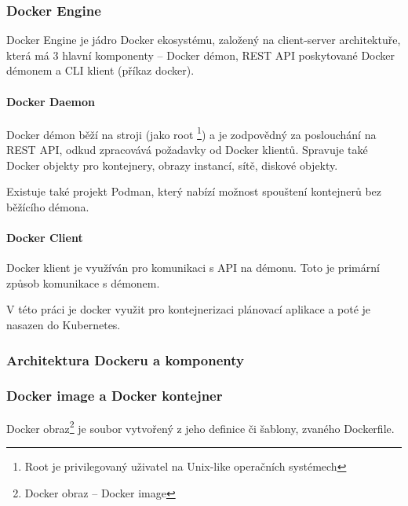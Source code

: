 \documentclass[thesis=M,czech]{FITthesis}[2019/12/23]
\theoremstyle{plain}
\theoremstyle{definition}
\begin{document}
\subsubsection{Docker Engine}

Docker Engine je jádro Docker ekosystému, založený na client-server architektuře, která má 3 hlavní komponenty -- Docker démon, REST API poskytované Docker démonem a CLI klient (příkaz docker).




\paragraph{Docker Daemon}

Docker démon běží na stroji (jako root \footnote{Root je privilegovaný uživatel na Unix-like operačních systémech}) a je zodpovědný za poslouchání na REST API, odkud zpracovává požadavky od Docker klientů. Spravuje také Docker objekty pro kontejnery, obrazy instancí, sítě, diskové objekty.


Existuje také projekt Podman, který nabízí možnost spouštení kontejnerů bez běžícího démona. 

\paragraph{Docker Client}

Docker klient je využíván pro komunikaci s API na démonu. Toto je primární způsob komunikace s démonem.


V této práci je docker využit pro kontejnerizaci plánovací aplikace a poté je nasazen do Kubernetes.




\subsubsection{Architektura Dockeru a komponenty}


\subsubsection{Docker image a Docker kontejner}


Docker obraz\footnote{Docker obraz -- Docker image} je soubor vytvořený z jeho definice či šablony, zvaného Dockerfile.  
\end{document}
